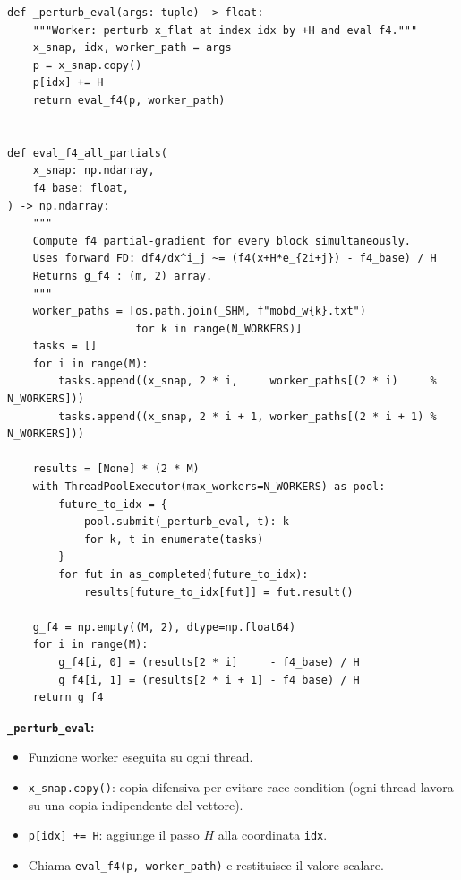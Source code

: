 \documentclass[12pt,a4paper]{article}
\theoremstyle{definition}
\begin{document}
\begin{lstlisting}[caption={Righe 81–125 — Worker function e calcolo parallelo del gradiente di $f_4$}]
def _perturb_eval(args: tuple) -> float:
    """Worker: perturb x_flat at index idx by +H and eval f4."""
    x_snap, idx, worker_path = args
    p = x_snap.copy()
    p[idx] += H
    return eval_f4(p, worker_path)


def eval_f4_all_partials(
    x_snap: np.ndarray,
    f4_base: float,
) -> np.ndarray:
    """
    Compute f4 partial-gradient for every block simultaneously.
    Uses forward FD: df4/dx^i_j ~= (f4(x+H*e_{2i+j}) - f4_base) / H
    Returns g_f4 : (m, 2) array.
    """
    worker_paths = [os.path.join(_SHM, f"mobd_w{k}.txt")
                    for k in range(N_WORKERS)]
    tasks = []
    for i in range(M):
        tasks.append((x_snap, 2 * i,     worker_paths[(2 * i)     % N_WORKERS]))
        tasks.append((x_snap, 2 * i + 1, worker_paths[(2 * i + 1) % N_WORKERS]))

    results = [None] * (2 * M)
    with ThreadPoolExecutor(max_workers=N_WORKERS) as pool:
        future_to_idx = {
            pool.submit(_perturb_eval, t): k
            for k, t in enumerate(tasks)
        }
        for fut in as_completed(future_to_idx):
            results[future_to_idx[fut]] = fut.result()

    g_f4 = np.empty((M, 2), dtype=np.float64)
    for i in range(M):
        g_f4[i, 0] = (results[2 * i]     - f4_base) / H
        g_f4[i, 1] = (results[2 * i + 1] - f4_base) / H
    return g_f4
\end{lstlisting}

\textbf{\texttt{\_perturb\_eval}:}
\begin{itemize}[nosep]
  \item Funzione worker eseguita su ogni thread.
  \item \texttt{x\_snap.copy()}: copia difensiva per evitare race condition (ogni thread lavora
        su una copia indipendente del vettore).
  \item \texttt{p[idx] += H}: aggiunge il passo $H$ alla coordinata \texttt{idx}.
  \item Chiama \texttt{eval\_f4(p, worker\_path)} e restituisce il valore scalare.
\end{itemize}
\end{document}

